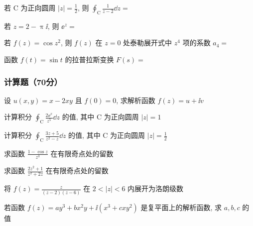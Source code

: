 \begin{ti}
	若 $\mathrm{C}$ 为正向圆周 $|z|=\frac{1}{2}$, 则 $\oint_{\mathrm{C}} \frac{1}{z-2} \dd z=$ \hua{}
\end{ti}

\begin{ti}
	若 $z=2-\uppi\ii$, 则 $\ee^{z}=$ \hua{}
\end{ti}

\begin{ti}
	若 $f(z)=\cos z^2$, 则 $f(z)$ 在 $z=0$ 处泰勒展开式中 $z^4$ 项的系数 $a_4=$ \hua{}
\end{ti}

\begin{ti}
	函数 $f(t)=\sin t$ 的拉普拉斯变换 $F(s)=$ \hua{}
\end{ti}

\subsubsection{计算题（70分）}
\begin{ti}[$10$ 分]
	设 $u(x,y)=x-2xy$ 且 $f(0)=0$, 求解析函数 $f(z)=u+\ii v$
\end{ti}

\begin{ti}[$7$ 分]
	计算积分 $\oint_{\mathrm{C}}\frac{2\ee^x}{z^5}\dd z$ 的值, 其中 $\mathrm{C}$ 为正向圆周 $|z|=1$
\end{ti}

\begin{ti}[$7$ 分]
	计算积分 $\oint_{\mathrm{C}}\frac{3z+5}{z^2-z}\dd z$ 的值, 其中 $\mathrm{C}$ 为正向圆周 $|z|=\frac{1}{2}$
\end{ti}

\begin{ti}[$7$ 分]
	求函数 $\frac{1-\cos z}{z^3}$ 在有限奇点处的留数
\end{ti}

\begin{ti}[$7$ 分]
	求函数 $\frac{2z^2+1}{z^2+2z}$ 在有限奇点处的留数
\end{ti}

\begin{ti}[$10$ 分]
	将 $f(z)=\frac{z}{(z-2)(z-6)}$ 在 $2<|z|<6$ 内展开为洛朗级数
\end{ti}

\begin{ti}[$12$ 分]
	若函数 $f(z)=a y^{3}+b x^{2} y+\ii\left(x^{3}+c x y^{2}\right)$ 是复平面上的解析函数, 求 $a,b,c$ 的值
\end{ti}

